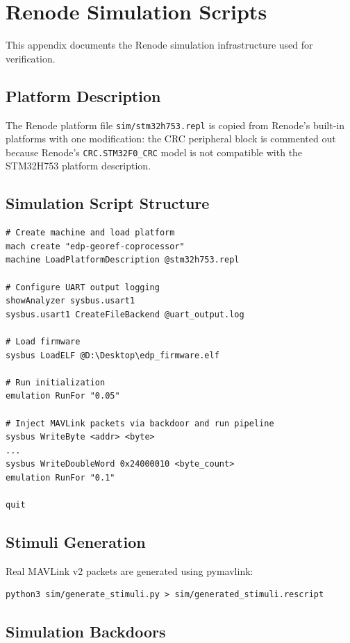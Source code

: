 \chapter{Renode Simulation Scripts}
\label{app:D}

This appendix documents the Renode simulation infrastructure used for verification.

\section{Platform Description}

The Renode platform file \texttt{sim/stm32h753.repl} is copied from Renode's built-in platforms with one modification: the CRC peripheral block is commented out because Renode's \texttt{CRC.STM32F0\_CRC} model is not compatible with the STM32H753 platform description.

\section{Simulation Script Structure}

\begin{lstlisting}[style=plainstyle]
# Create machine and load platform
mach create "edp-georef-coprocessor"
machine LoadPlatformDescription @stm32h753.repl

# Configure UART output logging
showAnalyzer sysbus.usart1
sysbus.usart1 CreateFileBackend @uart_output.log

# Load firmware
sysbus LoadELF @D:\Desktop\edp_firmware.elf

# Run initialization
emulation RunFor "0.05"

# Inject MAVLink packets via backdoor and run pipeline
sysbus WriteByte <addr> <byte>
...
sysbus WriteDoubleWord 0x24000010 <byte_count>
emulation RunFor "0.1"

quit
\end{lstlisting}

\section{Stimuli Generation}

Real MAVLink v2 packets are generated using pymavlink:
\begin{lstlisting}[style=plainstyle]
python3 sim/generate_stimuli.py > sim/generated_stimuli.rescript
\end{lstlisting}

\section{Simulation Backdoors}

